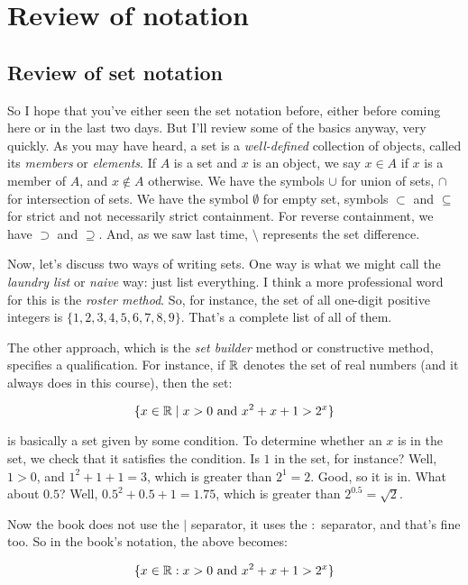 \documentclass{amsart}
\begin{document}
\section{Review of notation}

\subsection{Review of set notation}

So I hope that you've either seen the set notation before, either
before coming here or in the last two days. But I'll review some of
the basics anyway, very quickly. As you may have heard, a set is a
{\em well-defined} collection of objects, called its {\em members} or
{\em elements}. If $A$ is a set and $x$ is an object, we say $x \in A$
if $x$ is a member of $A$, and $x \notin A$ otherwise. We have the
symbols $\cup$ for union of sets, $\cap$ for intersection of sets. We
have the symbol $\emptyset$ for empty set, symbols $\subset$ and
$\subseteq$ for strict and not necessarily strict containment. For
reverse containment, we have $\supset$ and $\supseteq$. And, as we saw
last time, $\setminus$ represents the set difference.

Now, let's discuss two ways of writing sets. One way is what we might
call the {\em laundry list} or {\em naive} way: just list
everything. I think a more professional word for this is the {\em
roster method}. So, for instance, the set of all one-digit positive
integers is $\{ 1,2,3,4,5,6,7,8,9\}$. That's a complete list of all of
them.

The other approach, which is the {\em set builder} method or constructive
method, specifies a qualification. For instance, if $\mathbb{R}$ denotes the
set of real numbers (and it always does in this course), then the set:

$$\{ x \in \mathbb{R} \mid x > 0 \text{ and } x^2 + x + 1 > 2^x \}$$

is basically a set given by some condition. To determine whether an
$x$ is in the set, we check that it satisfies the condition. Is $1$ in
the set, for instance? Well, $1 > 0$, and $1^2 + 1 + 1 = 3$, which is
greater than $2^1 = 2$. Good, so it is in. What about $0.5$? Well,
$0.5^2 + 0.5 + 1 = 1.75$, which is greater than $2^{0.5} = \sqrt{2}$.

Now the book does not use the $\mid$ separator, it uses the $:$
separator, and that's fine too. So in the book's notation, the above
becomes:

$$\{ x \in \mathbb{R} : x > 0 \text{ and } x^2 + x + 1 > 2^x \}$$
\end{document}
